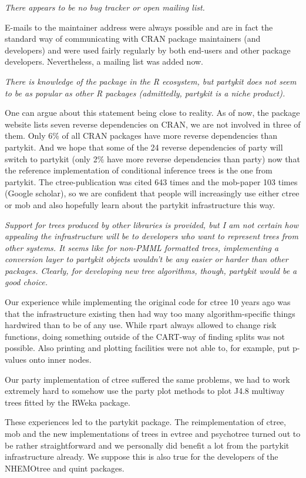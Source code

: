 \documentclass{article}
\begin{document}
\textit{There appears to
be no bug tracker or open mailing list.}

E-mails to the maintainer address were always possible and are in fact the standard
way of communicating with CRAN package maintainers (and developers) and were 
used fairly regularly by both end-users and other package developers. 
Nevertheless, a mailing list was added now.

\textit{There is knowledge of the package
in the R ecosystem, but partykit does not seem to be as popular as other R
packages (admittedly, partykit is a niche product).}

One can argue about this statement being close to reality. As of now, the
package website lists seven reverse dependencies on CRAN, we are not
involved in three of them. Only 6\% of all CRAN packages have more 
reverse dependencies than partykit. And we hope that some of the 24 
reverse dependencies of party will switch to partykit
(only 2\% have more reverse dependencies than party) now that the reference
implementation of conditional inference trees is the one from partykit.
The ctree-publication was cited 643 times and the mob-paper 103 times 
(Google scholar), so we are confident that people will increasingly use
either ctree or mob and also hopefully learn about the partykit
infrastructure this way.

\textit{
Support for trees produced by other libraries is provided, but I am not
certain how appealing the infrastructure will be to developers who want to
represent trees from other systems.  It seems like for non-PMML formatted
trees, implementing a conversion layer to partykit objects wouldn't be any
easier or harder than other packages. Clearly, for developing new tree
algorithms, though, partykit would be a good choice.}

Our experience while implementing the original code for ctree 10 years ago
was that the infrastructure existing then had way too many
algorithm-specific things hardwired than to be of any use. While rpart
always allowed to change risk functions, doing something outside of the
CART-way of finding splits was not possible. Also printing and plotting
facilities were not able to, for example, put p-values onto inner nodes.

Our party implementation of ctree suffered the same problems, we had to work
extremely hard to somehow use the party plot methods to plot J4.8 multiway 
trees fitted by the RWeka package.

These experiences led to the partykit package. The reimplementation of
ctree, mob and the new implementations of trees in evtree and psychotree
turned out to be rather straightforward and we personally did benefit a lot
from the partykit infrastructure already. We suppose this is also true for
the developers of the NHEMOtree and quint packages.
\end{document}
